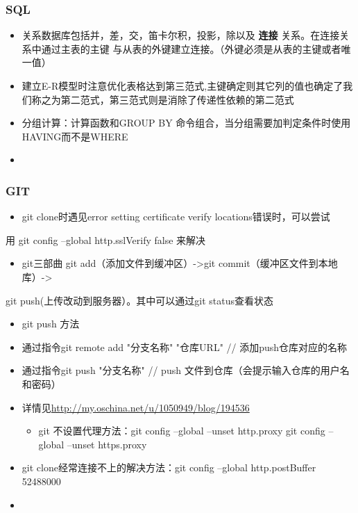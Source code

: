 \documentclass[11pt]{article}
\begin{document}
\subsubsection{SQL}
\label{sec-1-2-6}
\begin{itemize}
\item 关系数据库包括并，差，交，笛卡尔积，投影，除以及 \textbf{连接} 关系。在连接关系中通过主表的主键
与从表的外键建立连接。（外键必须是从表的主键或者唯一值）
\item 建立E-R模型时注意优化表格达到第三范式,主键确定则其它列的值也确定了我们称之为第二范式，第三范式则是消除了传递性依赖的第二范式
\item 分组计算：计算函数和GROUP BY 命令组合，当分组需要加判定条件时使用HAVING而不是WHERE
\item 
\end{itemize}

\subsubsection{GIT}
\label{sec-1-2-7}
\begin{itemize}
\item git clone时遇见error setting certificate verify locations错误时，可以尝试
\end{itemize}
用 git config --global http.sslVerify false 来解决
\begin{itemize}
\item git三部曲 git add（添加文件到缓冲区）->git commit（缓冲区文件到本地库）->
\end{itemize}
git push(上传改动到服务器）。其中可以通过git status查看状态
\begin{itemize}
\item git push 方法
\item 通过指令git remote add "分支名称" "仓库URL" // 添加push仓库对应的名称
\item 通过指令git push "分支名称" // push 文件到仓库（会提示输入仓库的用户名和密码）
\item 详情见\url{http://my.oschina.net/u/1050949/blog/194536} 
\begin{itemize}
\item git 不设置代理方法：git config --global --unset http.proxy
git config --global --unset https.proxy
\end{itemize}
\item git clone经常连接不上的解决方法：git config --global http.postBuffer 52488000
\item 
\end{itemize}
\end{document}
